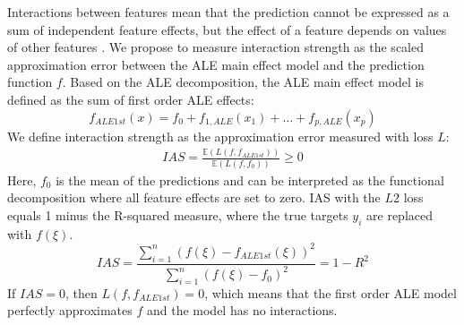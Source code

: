 \documentclass[runningheads]{llncs}\usepackage[]{graphicx}\usepackage[]{color}
\newcommand{\faleme}{f_{ALE1st}}
\begin{document}
Interactions between features mean that the prediction cannot be expressed as a sum of independent feature effects, but the effect of a feature depends on values of other features \citep{molnar2019}.
We propose to measure interaction strength as the scaled approximation error between the ALE main effect model and the prediction function $f$.
Based on the ALE decomposition, the ALE main effect model is defined as the sum of first order ALE effects:
$$\faleme(x) = f_0 + f_{1,ALE}(x_1) + \ldots + f_{p,ALE}(x_p)$$
We define interaction strength as the approximation error measured with loss $L$:
\begin{eqnarray}\label{eqn:pre}
IAS = \frac{\mathbb{E}(L(f, \faleme))}{\mathbb{E}(L(f, f_0))} \geq 0
\end{eqnarray}
Here, $f_0$ is the mean of the predictions and can be interpreted as the functional decomposition where all feature effects are set to zero.
IAS with the $L2$ loss equals 1 minus the R-squared measure, where the true targets $y_i$ are replaced with $f(\xi)$.
$$IAS = \frac{\sum_{i=1}^n(f(\xi)-\faleme(\xi))^2}{\sum_{i=1}^n(f(\xi) - f_0)^2} = 1 - R^2$$
If $IAS=0$, then $L(f,\faleme)=0$, which means that the first order ALE model perfectly approximates $f$ and the model has no interactions.

\end{document}
